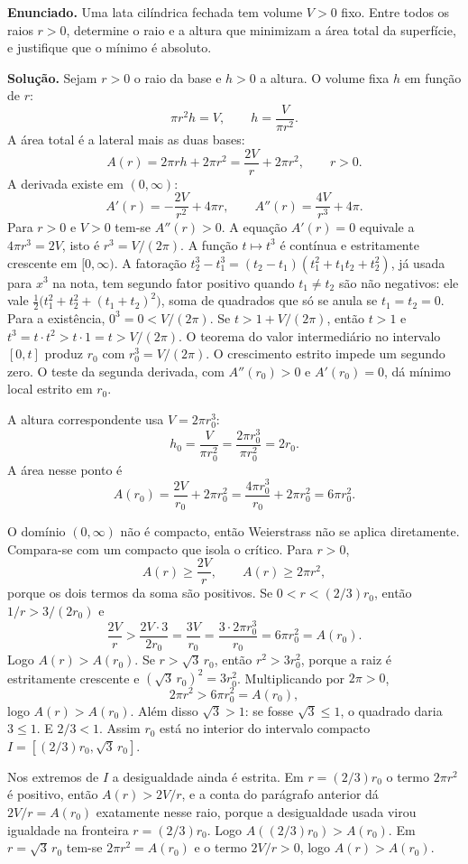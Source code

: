 \documentclass[11pt,a4paper]{article}
\begin{document}
\textbf{Enunciado.} Uma lata cilíndrica fechada tem volume $V>0$ fixo. Entre todos os raios $r>0$, determine o raio e a altura que minimizam a área total da superfície, e justifique que o mínimo é absoluto.

\textbf{Solução.}
Sejam $r>0$ o raio da base e $h>0$ a altura. O volume fixa $h$ em função de $r$:
\[
\pi r^2 h=V,\qquad h=\frac{V}{\pi r^2}.
\]
A área total é a lateral mais as duas bases:
\[
A(r)=2\pi rh+2\pi r^2=\frac{2V}{r}+2\pi r^2,\qquad r>0.
\]
A derivada existe em $(0,\infty)$:
\[
A'(r)=-\frac{2V}{r^2}+4\pi r,\qquad A''(r)=\frac{4V}{r^3}+4\pi.
\]
Para $r>0$ e $V>0$ tem-se $A''(r)>0$. A equação $A'(r)=0$ equivale a $4\pi r^3=2V$, isto é $r^3=V/(2\pi)$. A função $t\mapsto t^3$ é contínua e estritamente crescente em $[0,\infty)$. A fatoração $t_2^3-t_1^3=(t_2-t_1)(t_1^2+t_1t_2+t_2^2)$, já usada para $x^3$ na nota, tem segundo fator positivo quando $t_1\neq t_2$ são não negativos: ele vale $\frac12\bigl(t_1^2+t_2^2+(t_1+t_2)^2\bigr)$, soma de quadrados que só se anula se $t_1=t_2=0$. Para a existência, $0^3=0<V/(2\pi)$. Se $t>1+V/(2\pi)$, então $t>1$ e $t^3=t\cdot t^2>t\cdot 1=t>V/(2\pi)$. O teorema do valor intermediário no intervalo $[0,t]$ produz $r_0$ com $r_0^3=V/(2\pi)$. O crescimento estrito impede um segundo zero. O teste da segunda derivada, com $A''(r_0)>0$ e $A'(r_0)=0$, dá mínimo local estrito em $r_0$.

A altura correspondente usa $V=2\pi r_0^3$:
\[
h_0=\frac{V}{\pi r_0^2}=\frac{2\pi r_0^3}{\pi r_0^2}=2r_0.
\]
A área nesse ponto é
\[
A(r_0)=\frac{2V}{r_0}+2\pi r_0^2=\frac{4\pi r_0^3}{r_0}+2\pi r_0^2=6\pi r_0^2.
\]

O domínio $(0,\infty)$ não é compacto, então Weierstrass não se aplica diretamente. Compara-se com um compacto que isola o crítico. Para $r>0$,
\[
A(r)\ge\frac{2V}{r},\qquad A(r)\ge 2\pi r^2,
\]
porque os dois termos da soma são positivos. Se $0<r<(2/3)r_0$, então $1/r>3/(2r_0)$ e
\[
\frac{2V}{r}>\frac{2V\cdot 3}{2r_0}=\frac{3V}{r_0}=\frac{3\cdot 2\pi r_0^3}{r_0}=6\pi r_0^2=A(r_0).
\]
Logo $A(r)>A(r_0)$. Se $r>\sqrt{3}\,r_0$, então $r^2>3r_0^2$, porque a raiz é estritamente crescente e $(\sqrt{3}\,r_0)^2=3r_0^2$. Multiplicando por $2\pi>0$,
\[
2\pi r^2>6\pi r_0^2=A(r_0),
\]
logo $A(r)>A(r_0)$. Além disso $\sqrt{3}>1$: se fosse $\sqrt{3}\le 1$, o quadrado daria $3\le 1$. E $2/3<1$. Assim $r_0$ está no interior do intervalo compacto $I=[(2/3)r_0,\sqrt{3}\,r_0]$.

Nos extremos de $I$ a desigualdade ainda é estrita. Em $r=(2/3)r_0$ o termo $2\pi r^2$ é positivo, então $A(r)>2V/r$, e a conta do parágrafo anterior dá $2V/r=A(r_0)$ exatamente nesse raio, porque a desigualdade usada virou igualdade na fronteira $r=(2/3)r_0$. Logo $A((2/3)r_0)>A(r_0)$. Em $r=\sqrt{3}\,r_0$ tem-se $2\pi r^2=A(r_0)$ e o termo $2V/r>0$, logo $A(r)>A(r_0)$.
\end{document}
